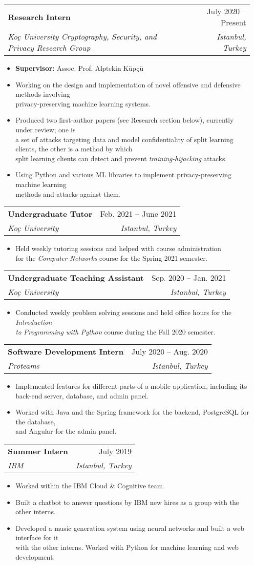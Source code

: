 \documentclass[letterpaper,11pt]{article}
\makeatletter
\newcommand{\resumeItem}[1]{
  \item\small{
    {#1 \vspace{-2pt}}
  }
}
\newcommand{\resumeSubheading}[4]{
  \vspace{-2pt}\item
    \begin{tabular*}{0.97\textwidth}[t]{l@{\extracolsep{\fill}}r}
      \textbf{#1} & #2 \\
      \textit{\small#3} & \textit{\small #4} \\
    \end{tabular*}\vspace{-7pt}
}
\newcommand{\resumeItemListStart}{
  \begin{itemize}
}
\newcommand{\resumeItemListEnd}{
  \end{itemize}\vspace{-4pt}
}
\makeatother
\begin{document}
  \resumeSubheading
    {Research Intern}{July 2020 -- Present}
    {Koç University Cryptography, Security, and Privacy Research Group}{Istanbul, Turkey}
  \resumeItemListStart
    \resumeItem{\textbf{Supervisor:} Assoc. Prof. Alptekin Küpçü}
    \resumeItem{Working on the design and implementation of novel offensive and defensive methods involving \\ privacy-preserving machine learning systems.}
    \resumeItem{Produced two first-author papers (see Research section below), currently under review; one is \\ a set of attacks targeting data and model confidentiality of split learning clients, the other is a method by which \\ split learning clients can detect and prevent \textit{training-hijacking} attacks.}
    \resumeItem{Using Python and various ML libraries to implement privacy-preserving machine learning \\ methods and attacks against them. }
  \resumeItemListEnd

  \resumeSubheading
    {Undergraduate Tutor}{Feb. 2021 -- June 2021}
    {Koç University}{Istanbul, Turkey}
  \resumeItemListStart
    \resumeItem{Held weekly tutoring sessions and helped with course administration\\ for the \textit{Computer Networks} course for the Spring 2021 semester.}
  \resumeItemListEnd

  \resumeSubheading
    {Undergraduate Teaching Assistant}{Sep. 2020 -- Jan. 2021}
    {Koç University}{Istanbul, Turkey}
  \resumeItemListStart
    \resumeItem{Conducted weekly problem solving sessions and held office hours for the \textit{Introduction \\ to Programming with Python} course during the Fall 2020 semester.}
  \resumeItemListEnd

  \resumeSubheading
    {Software Development Intern}{July 2020 -- Aug. 2020}
    {Proteams}{Istanbul, Turkey}
  \resumeItemListStart
    \resumeItem{Implemented features for different parts of a mobile application, including its \\ back-end server, database, and admin panel.}
    \resumeItem{Worked with Java and the Spring framework for the backend, PostgreSQL for the database, \\ and Angular for the admin panel.}
  \resumeItemListEnd

  \resumeSubheading
    {Summer Intern}{July 2019}
    {IBM}{Istanbul, Turkey}
  \resumeItemListStart
    \resumeItem{Worked within the IBM Cloud \& Cognitive team.}
    \resumeItem{Built a chatbot to answer questions by IBM new hires as a group with the other interns.}
    \resumeItem{Developed a music generation system using neural networks and built a web interface for it \\ with the other interns. Worked with Python for machine learning and web development.}
  \resumeItemListEnd
\end{document}
